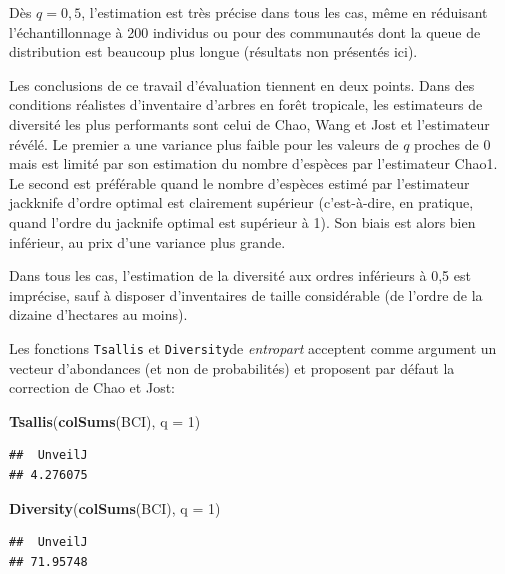\documentclass[
  11pt,
  french,
  a4paper,
  extrafontsizes,onecolumn,openright
  ]{memoir}
\newenvironment{Shaded}{\begin{snugshade}}{\end{snugshade}}
\newcommand{\DataTypeTok}[1]{\textcolor[rgb]{0.13,0.29,0.53}{#1}}
\newcommand{\DecValTok}[1]{\textcolor[rgb]{0.00,0.00,0.81}{#1}}
\newcommand{\KeywordTok}[1]{\textcolor[rgb]{0.13,0.29,0.53}{\textbf{#1}}}
\newcommand{\NormalTok}[1]{#1}
\newlength{\rf}
\begin{document}
Dès \(q=0,5\), l'estimation est très précise dans tous les cas, même en réduisant l'échantillonnage à 200 individus ou pour des communautés dont la queue de distribution est beaucoup plus longue (résultats non présentés ici).

Les conclusions de ce travail d'évaluation tiennent en deux points.
Dans des conditions réalistes d'inventaire d'arbres en forêt tropicale, les estimateurs de diversité les plus performants sont celui de Chao, Wang et Jost et l'estimateur révélé.
Le premier a une variance plus faible pour les valeurs de \(q\) proches de 0 mais est limité par son estimation du nombre d'espèces par l'estimateur Chao1.
Le second est préférable quand le nombre d'espèces estimé par l'estimateur jackknife d'ordre optimal est clairement supérieur (c'est-à-dire, en pratique, quand l'ordre du jacknife optimal est supérieur à 1).
Son biais est alors bien inférieur, au prix d'une variance plus grande.

Dans tous les cas, l'estimation de la diversité aux ordres inférieurs à 0,5 est imprécise, sauf à disposer d'inventaires de taille considérable (de l'ordre de la dizaine d'hectares au moins).

Les fonctions \texttt{Tsallis} et \texttt{Diversity}de \emph{entropart} acceptent comme argument un vecteur d'abondances (et non de probabilités) et proposent par défaut la correction de Chao et Jost:

\scriptsize

\begin{Shaded}
\begin{Highlighting}[]
\KeywordTok{Tsallis}\NormalTok{(}\KeywordTok{colSums}\NormalTok{(BCI), }\DataTypeTok{q =} \DecValTok{1}\NormalTok{)}
\end{Highlighting}
\end{Shaded}

\begin{verbatim}
##  UnveilJ 
## 4.276075
\end{verbatim}

\begin{Shaded}
\begin{Highlighting}[]
\KeywordTok{Diversity}\NormalTok{(}\KeywordTok{colSums}\NormalTok{(BCI), }\DataTypeTok{q =} \DecValTok{1}\NormalTok{)}
\end{Highlighting}
\end{Shaded}

\begin{verbatim}
##  UnveilJ 
## 71.95748
\end{verbatim}
\end{document}
